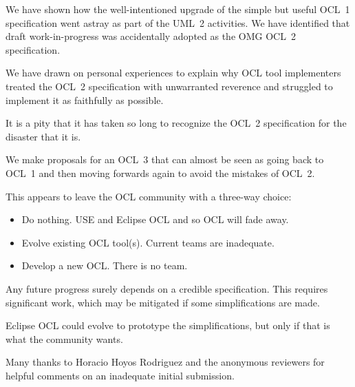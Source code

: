 \documentclass{jot}
\begin{document}
We have shown how the well-intentioned upgrade of the simple but useful OCL~1 specification went astray as part of the UML~2 activities. We have identified that draft work-in-progress was accidentally adopted as the OMG OCL~2 specification.

We have drawn on personal experiences to explain why OCL tool implementers treated the OCL~2 specification with unwarranted reverence and struggled to implement it as faithfully as possible.

It is a pity that it has taken so long to recognize the OCL~2 specification for the disaster that it is.

We make proposals for an OCL~3 that can almost be seen as going back to OCL~1 and then moving forwards again to avoid the mistakes of OCL~2.

This appears to leave the OCL community with a three-way choice:
\begin{itemize}
\item Do nothing. USE and Eclipse OCL and so OCL will fade away.
\item Evolve existing OCL tool(s). Current teams are inadequate.
\item Develop a new OCL. There is no team.
\end{itemize}

Any future progress surely depends on a credible specification. This requires significant work, which may be mitigated if some simplifications are made.

Eclipse OCL could evolve to prototype the simplifications, but only if that is what the community wants.
\backmatter




\abouttheauthors

\begin{acknowledgments}
Many thanks to Horacio Hoyos Rodriguez and the anonymous reviewers for helpful comments on an inadequate initial submission.
\end{acknowledgments}
\end{document}
